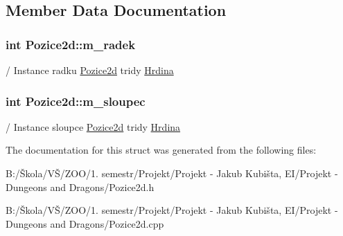 \subsection{Member Data Documentation}
\hypertarget{struct_pozice2d_a8ae2a4f9f73a09127963ab072c6aaed0}{
\subsubsection[{m\-\_\-radek}]{\setlength{\rightskip}{0pt plus 5cm}int Pozice2d\-::m\-\_\-radek}}\label{struct_pozice2d_a8ae2a4f9f73a09127963ab072c6aaed0}
/ Instance radku \hyperlink{struct_pozice2d}{Pozice2d} tridy \hyperlink{class_hrdina}{Hrdina} \hypertarget{struct_pozice2d_ab6a744127dd182633f77551b7240938f}{
\subsubsection[{m\-\_\-sloupec}]{\setlength{\rightskip}{0pt plus 5cm}int Pozice2d\-::m\-\_\-sloupec}}\label{struct_pozice2d_ab6a744127dd182633f77551b7240938f}
/ Instance sloupce \hyperlink{struct_pozice2d}{Pozice2d} tridy \hyperlink{class_hrdina}{Hrdina} 

The documentation for this struct was generated from the following files\-:\begin{DoxyCompactItemize}
\item 
B\-:/Škola/\-VŠ/\-Z\-O\-O/1. semestr/\-Projekt/\-Projekt -\/ Jakub Kubišta, E\-I/\-Projekt -\/ Dungeons and Dragons/Pozice2d.\-h\item 
B\-:/Škola/\-VŠ/\-Z\-O\-O/1. semestr/\-Projekt/\-Projekt -\/ Jakub Kubišta, E\-I/\-Projekt -\/ Dungeons and Dragons/Pozice2d.\-cpp\end{DoxyCompactItemize}
